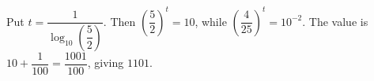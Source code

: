 Put $t=\dfrac{1}{\log_{10}(\dfrac{5}{2})}$. Then $(\dfrac{5}{2})^t=10$, while $(\dfrac{4}{25})^t=10^{-2}$. The value is $10+\dfrac{1}{100}=\dfrac{1001}{100}$, giving $\boxed{1101}$.
